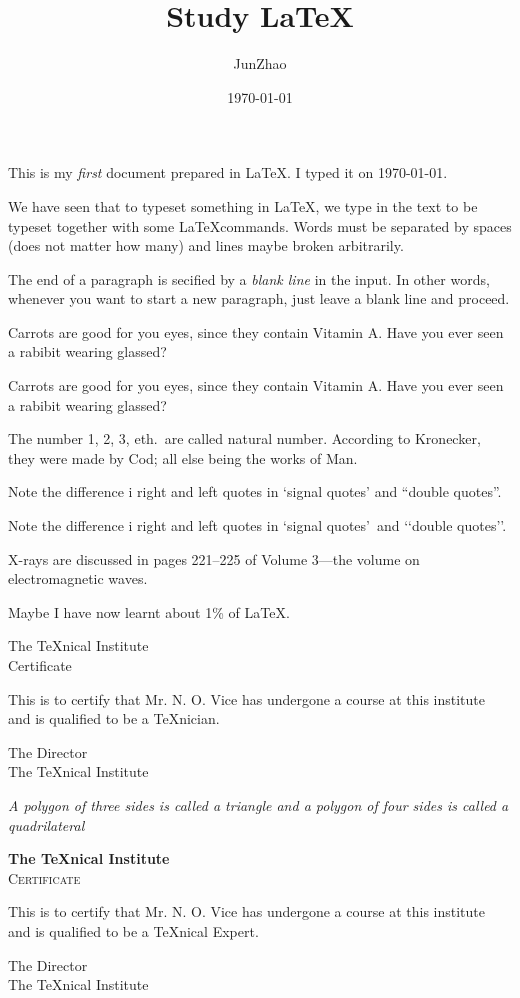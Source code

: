 \documentclass{book}
\begin{document}
\title{Study \LaTeX}
\author{JunZhao}
\date{\today}
\maketitle

\noindent This is my \emph{first} document prepared in \LaTeX. I typed it on \today.

We have seen that to typeset something in \LaTeX, we type in the
text to be typeset together with some \LaTeX commands.
Words must be separated by spaces (does not matter how many)
and lines maybe broken arbitrarily.

The end of a paragraph is secified by a \emph{blank line}
in the input. In other words, whenever you want to start a new
paragraph, just leave a blank line and proceed.

Carrots are good for you eyes, since they contain Vitamin A. Have you ever seen a rabibit
wearing glassed?

Carrots are good for you eyes, since they contain Vitamin A\@. Have you ever seen a rabibit
wearing glassed?

The number 1, 2, 3, eth.\ are called natural number. According to Kronecker, they were made
by Cod; all else being the works of Man.

Note the difference i right and left quotes in `signal quotes' and ``double quotes''.

Note the difference i right and left quotes in \lq signal quotes\rq\ and \lq\lq double quotes\rq\rq.

X-rays are discussed in pages 221--225 of Volume 3---the volume on electromagnetic waves.

Maybe I have now learnt about 1\% of \LaTeX.

\begin{center}
The \TeX nical Institute\\[.75cm]
Certificate
\end{center}
\noindent This is to certify that Mr. N. O. Vice has undergone a
course at this institute and is qualified to be a \TeX nician.
\begin{flushright}
The Director\\
The \TeX nical Institute
\end{flushright}

\textit{A polygon of three sides is called a \emph{triangle} and a
polygon of four sides is called a \emph{quadrilateral}}

\begin{center}
{\bfseries\huge The \TeX nical Institute}\\[1cm]
{\scshape\LARGE Certificate}
\end{center}
\noindent This is to certify that Mr. N. O. Vice has undergone a
course at this institute and is qualified to be a \TeX nical Expert.
\begin{flushright}
{\sffamily The Director\\
The \TeX nical Institute}
\end{flushright}
\end{document}
